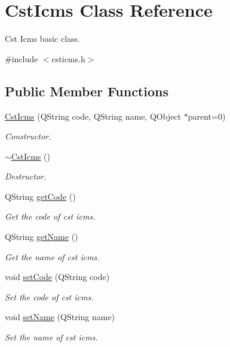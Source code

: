\hypertarget{class_cst_icms}{\section{\-Cst\-Icms \-Class \-Reference}
\label{class_cst_icms}
}


\-Cst \-Icms basic class.  




{\ttfamily \#include $<$csticms.\-h$>$}

\subsection*{\-Public \-Member \-Functions}
\begin{DoxyCompactItemize}
\item 
\hyperlink{class_cst_icms_ad1ea9096b150703f3f0e7b5f996daaa8}{\-Cst\-Icms} (\-Q\-String code, \-Q\-String name, \-Q\-Object $\ast$parent=0)
\begin{DoxyCompactList}\small\item\em \-Constructor. \end{DoxyCompactList}\item 
\hyperlink{class_cst_icms_a75de888d8e84d2ddea2e47a9c0760175}{$\sim$\-Cst\-Icms} ()
\begin{DoxyCompactList}\small\item\em \-Destructor. \end{DoxyCompactList}\item 
\-Q\-String \hyperlink{class_cst_icms_ad08e862134650284baf7a6e840f9214a}{get\-Code} ()
\begin{DoxyCompactList}\small\item\em \-Get the code of cst icms. \end{DoxyCompactList}\item 
\-Q\-String \hyperlink{class_cst_icms_aa175851745f57efdfa75ce7098474e08}{get\-Name} ()
\begin{DoxyCompactList}\small\item\em \-Get the name of cst icms. \end{DoxyCompactList}\item 
void \hyperlink{class_cst_icms_a80a7709d29ef6ecf3666f81c18831f26}{set\-Code} (\-Q\-String code)
\begin{DoxyCompactList}\small\item\em \-Set the code of cst icms. \end{DoxyCompactList}\item 
void \hyperlink{class_cst_icms_a42a168dfa575f43d63e2bacd4f384169}{set\-Name} (\-Q\-String name)
\begin{DoxyCompactList}\small\item\em \-Set the name of cst icms. \end{DoxyCompactList}\end{DoxyCompactItemize}


